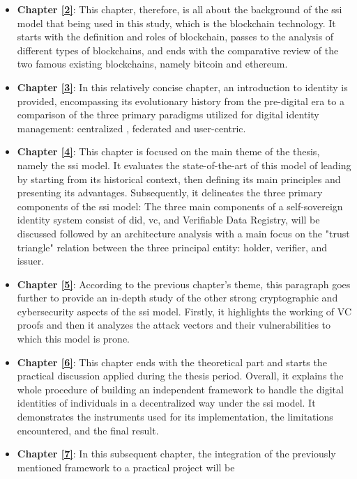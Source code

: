 \begin{itemize}
  \item \textbf{Chapter \hyperref[ch:blockchain]{[2]}}: This chapter, therefore, is all about the background of the \gls{ssi} model that being used in 
  this study, which is the blockchain technology. It starts with the definition and roles of blockchain, passes to the analysis of different types of blockchains, and ends 
  with the comparative review of the two famous existing blockchains, namely bitcoin and ethereum.
  \item \textbf{Chapter \hyperref[ch:identity]{[3]}}: In this relatively concise chapter, an introduction to identity is provided, encompassing its evolutionary history 
  from the pre-digital era to a comparison of the three primary paradigms utilized for digital identity management: centralized , federated and user-centric.
  \item \textbf{Chapter \hyperref[ch:ssi]{[4]}}: This chapter is focused on the main theme of the thesis, namely the \gls{ssi} model. It evaluates the state-of-the-art of this 
  model of leading by starting from its historical context, then defining its main principles and presenting its advantages. Subsequently, it delineates the three primary 
  components of the \gls{ssi} model: The three main components of a self-sovereign identity system consist of \gls{did}, \gls{vc}, and Verifiable Data Registry, will be discussed 
  followed by an architecture analysis with a main focus on the "trust triangle" relation between the three principal entity: holder, verifier, and issuer.
  \item \textbf{Chapter \hyperref[ch:security]{[5]}}: According to the previous chapter's theme, this paragraph goes further to provide an in-depth study of the other 
  strong cryptographic and cybersecurity aspects of the \gls{ssi} model. Firstly, it highlights the working of VC proofs and then it analyzes the attack vectors and their 
  vulnerabilities to which this model is prone.
  \item \textbf{Chapter \hyperref[ch:framework]{[6]}}: This chapter ends with the theoretical part and starts the practical discussion applied during the thesis period. 
  Overall, it explains the whole procedure of building an independent framework to handle the digital identities of individuals in a decentralized way under the \gls{ssi} model. 
  It demonstrates the instruments used for its implementation, the limitations encountered, and the final result.
  \item \textbf{Chapter \hyperref[ch:integration]{[7]}}: In this subsequent chapter, the integration of the previously mentioned framework to a practical project will be 

\end{itemize}
